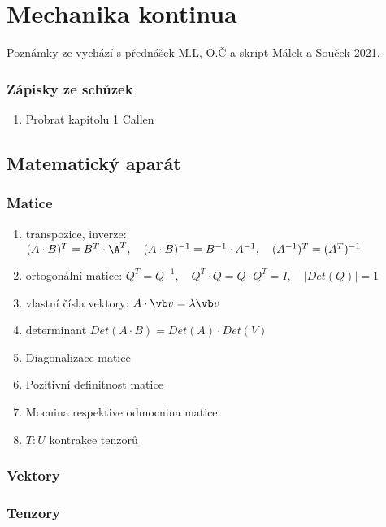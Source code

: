 \part{Mechanika kontinua}

Poznámky ze vychází s přednášek M.L, O.Č a skript Málek a Souček 2021.

\section{Zápisky ze schůzek}

\begin{enumerate}
    \item Probrat kapitolu 1 Callen 
\end{enumerate}


\chapter{Matematický aparát}

\section{Matice}

\begin{enumerate}
    \item transpozice, inverze: $(A \cdot B)^T = B^T \cdot \A^T, \quad (A \cdot B)^{-1} = B^{-1} \cdot A^{-1}, \quad (A^{-1})^T = (A^T)^{-1}$
    \item ortogonální matice:  $Q^T = Q^{-1}, \quad Q^T \cdot Q = Q \cdot Q^T = I, \quad |Det(Q)| = 1 $
    \item vlastní čísla  vektory: $A \cdot \vb v = \lambda \vb v$
    \item determinant $Det(A \cdot B) = Det(A) \cdot Det(V) $
    \item Diagonalizace matice
    \item Pozitivní definitnost matice
    \item Mocnina respektive odmocnina matice
    \item $T : U$ kontrakce tenzorů
\end{enumerate}

\section{Vektory}
\section{Tenzory}


